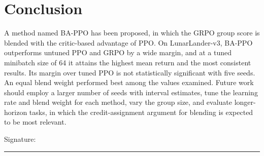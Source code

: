 \documentclass[11pt,a4paper]{article}
\begin{document}
\section{Conclusion}
\label{sec:conclusion}

A method named BA-PPO has been proposed, in which the GRPO group score is blended with the critic-based advantage of PPO. On LunarLander-v3, BA-PPO outperforms untuned PPO and GRPO by a wide margin, and at a tuned minibatch size of 64 it attains the highest mean return and the most consistent results. Its margin over tuned PPO is not statistically significant with five seeds. An equal blend weight performed best among the values examined. Future work should employ a larger number of seeds with interval estimates, tune the learning rate and blend weight for each method, vary the group size, and evaluate longer-horizon tasks, in which the credit-assignment argument for blending is expected to be most relevant.




\vspace{2cm}
\noindent Signature: \rule{6cm}{0.4pt}
\end{document}

